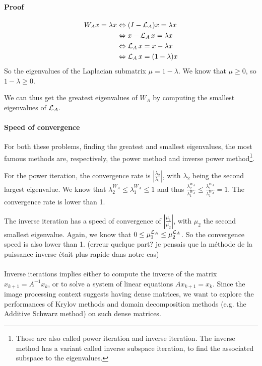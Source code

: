 \paragraph{Proof}

\begin{equation}
 \begin{split}
     W_A x = \lambda x & \Leftrightarrow (I - \operatorname{\mathcal{L}}_A)x = \lambda x \\
                     & \Leftrightarrow x - \operatorname{\mathcal{L}}_A x = \lambda x \\
                     & \Leftrightarrow \operatorname{\mathcal{L}}_A x = x - \lambda x \\
                     & \Leftrightarrow \operatorname{\mathcal{L}}_A x = (1 - \lambda) x
 \end{split}
\end{equation}
So the eigenvalues of the Laplacian submatrix \(\mu = 1 - \lambda\).
We know that \(\mu \ge 0\), so \(1 - \lambda \ge 0\).

We can thus get the greatest eigenvalues of \(W_A\) by computing the smallest eigenvalues of \(\operatorname{\mathcal{L}}_A\).

\paragraph{Speed of convergence}
For both these problems, finding the greatest and smallest eigenvalues, the most famous methods are, respectively, the power method and inverse power method\footnote{Those are also called power iteration and inverse iteration. The inverse method has a variant called inverse subspace iteration, to find the associated subspace to the eigenvalues.}.

For the power iteration, the convergence rate is \(|\frac{\lambda_2}{\lambda_1}|\), with \(\lambda_2\) being the second largest eigenvalue.
We know that \(\lambda^{W_A}_2 \le \lambda^{W_A}_1 \le 1\) and thus \(\frac{\lambda^{W_A}_2}{\lambda^{W_A}_1} \le \frac{\lambda^{W_A}_1}{\lambda^{W_A}_1} = 1\).
The convergence rate is lower than 1.

The inverse iteration has a speed of convergence of \(|\frac{\mu_1}{\mu_2}|\), with \(\mu_2\) the second smallest eigenvalue.
Again, we know that \(0 \le \mu^{\operatorname{\mathcal{L}}_A}_1 \le \mu^{\operatorname{\mathcal{L}}_A}_2\).
So the convergence speed is also lower than 1. (erreur quelque part? je pensais que la méthode de la puissance inverse était plus rapide dans notre cas)

\paragraph{}
Inverse iterations implies either to compute the inverse of the matrix \(x_{k+1} = A^{-1}x_k\), or to solve a system of linear equations \(Ax_{k+1} = x_k\).
Since the image processing context suggests having dense matrices, we want to explore the performances of Krylov methods and domain decomposition methods (e.g. the Additive Schwarz method) on such dense matrices.
